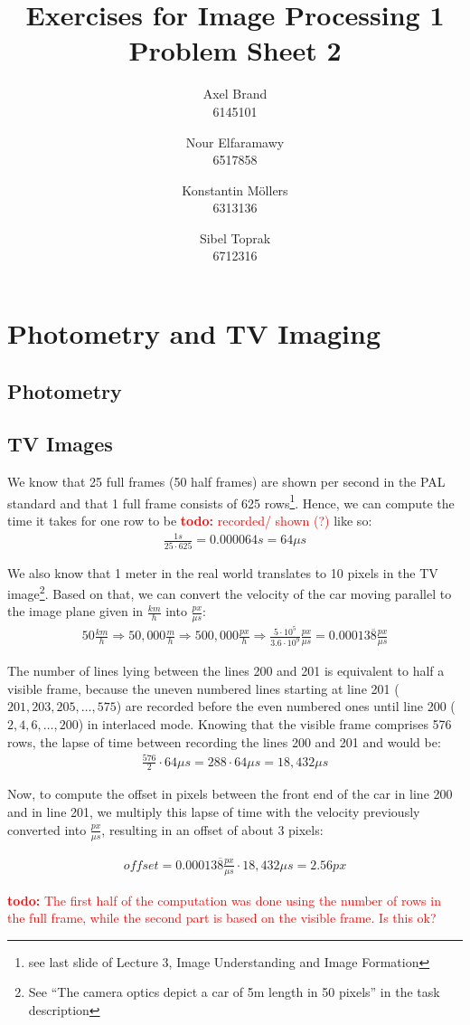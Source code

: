 \documentclass[a4paper,12pt]{article}
\title{\textbf{Exercises for Image Processing 1}\\Problem Sheet 2}
\author{Axel Brand\\6145101 \and Nour Elfaramawy\\6517858 \and Konstantin M\"ollers\\6313136 \and Sibel Toprak\\6712316}
\newcommand{\twodo}[1]{\textcolor{red}{\textbf{todo:} #1}}
\begin{document}
	\maketitle
	
	\section{Photometry and TV Imaging}
	
	\subsection{Photometry}
	
	\subsection{TV Images}
	We know that 25 full frames (50 half frames) are shown per second in the PAL standard and that 1 full frame consists of 625 rows\footnote{see last slide of Lecture 3, Image Understanding and Image Formation}. Hence, we can compute the time it takes for one row to be \twodo{recorded/ shown (?)} like so:
	\begin{align*}
		\frac{1 s}{25 \cdot 625} = 0.000064 s = 64\mu s
	\end{align*}
	
	We also know that 1 meter in the real world translates to 10 pixels in the TV image\footnote{See ``The camera optics depict a car of 5m length in 50 pixels'' in the task description}. Based on that, we can convert the velocity of the car moving parallel to the image plane given in $\frac{km}{h}$ into $\frac{px}{\mu s}$:
	\begin{align*}
		50 \frac{km}{h} \Rightarrow 50,000 \frac{m}{h} \Rightarrow 500,000 \frac{px}{h} \Rightarrow \frac{5 \cdot 10^{5}}{3.6 \cdot 10^{9}} \frac{px}{\mu s} = 0.00013\overline{8} \frac{px}{\mu s}
	\end{align*}
	
	The number of lines lying between the lines 200 and 201 is equivalent to half a visible frame, because the uneven numbered lines starting at line 201 ($201, 203, 205, \dots, 575$) are recorded before the even numbered ones until line 200 ($2, 4, 6, \dots, 200$) in interlaced mode. Knowing that the visible frame comprises 576 rows, the lapse of time between recording the lines 200 and 201 and would be:
	\begin{align*}
	\frac{576}{2} \cdot 64\mu s = 288 \cdot 64\mu s = 18,432 \mu s
	\end{align*}
	
	Now, to compute the offset in pixels between the front end of the car in line 200 and in line 201, we multiply this lapse of time with the velocity previously converted into $\frac{px}{\mu s}$, resulting in an offset of about 3 pixels:
	
	\begin{align*}
	offset = 0.00013\overline{8} \frac{px}{\mu s} \cdot 18,432 \mu s = 2.56 px
	\end{align*}
	
	\twodo{The first half of the computation was done using the number of rows in the full frame, while the second part is based on the visible frame. Is this ok?}
	
\end{document}
